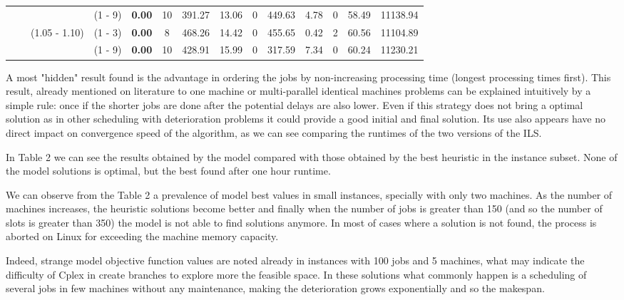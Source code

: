 \documentclass[a4paper,11pt]{article}
\begin{document}
\begin{table}[!ht]
\begin{tabular}{|c|c|c|c|c|c|c|c|c|c|c|c|c|c|}
 &  &  & 				 (1 - 9)  &  \textbf{0.00} &  10 &		391.27     &  13.06  	    &  0	&  449.63      &  4.78 & 0 &  58.49      &  11138.94 \\
 &  &    (1.05 - 1.10) & (1 - 3)  &  \textbf{0.00} &  8 &		468.26     &  14.42  	    &  0	&  455.65      &  0.42 & 2 &  60.56      &  11104.89 \\
 &  &  & 				 (1 - 9)  &  \textbf{0.00} &  10 &		428.91     &  15.99  	    &  0	&  317.59      &  7.34 & 0 &  60.24      &  11230.21 \\


\hline

\end{tabular}
\end{table}


A most "hidden" result found is the advantage in ordering the jobs by non-increasing processing time (longest processing times first). This result, already mentioned on literature to one machine or multi-parallel identical machines problems can be explained intuitively by a simple rule: once if the shorter jobs are done after the potential delays are also lower.  Even if this strategy does not bring a optimal solution as in other scheduling with deterioration problems it could provide a good initial and final solution. Its use also appears have no direct impact on convergence speed of the algorithm, as we can see comparing the runtimes of the two versions of the ILS. 

In Table 2 we can see the results obtained by the model compared with those obtained by the best heuristic in the instance subset. None of the model solutions is optimal, but the best found after one hour runtime. 

We can observe from the Table 2 a prevalence of model best values in small instances, specially with only two machines. As the number of machines increases, the heuristic solutions become better and finally when the number of jobs is greater than 150 (and so the number of slots is greater than 350) the model is not able to find solutions anymore. In most of cases where a solution is not found, the process is aborted on Linux for exceeding the machine memory capacity. 

Indeed, strange model objective function values are noted already in instances with 100 jobs and 5 machines, what may indicate the difficulty of Cplex in create branches to explore more the feasible space. In these solutions what commonly happen is a scheduling of several jobs in few machines without any maintenance, making the deterioration grows exponentially and so the makespan. 
\end{document}
